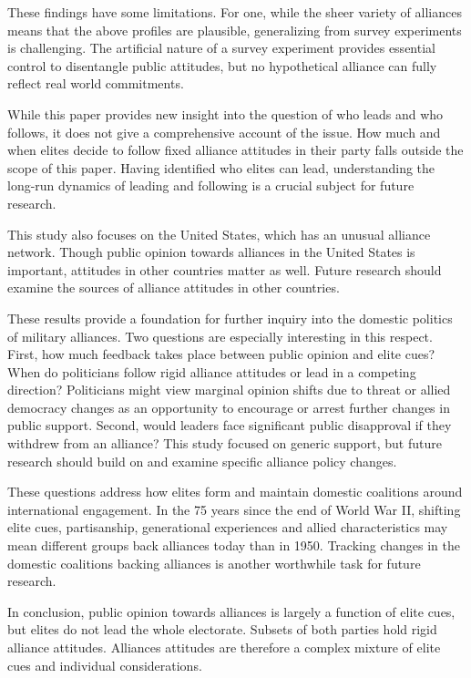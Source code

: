 \documentclass[12pt]{article}
\begin{document}
These findings have some limitations. 
For one, while the sheer variety of alliances means that the above profiles are plausible, generalizing from survey experiments is challenging. 
The artificial nature of a survey experiment provides essential control to disentangle public attitudes, but no hypothetical alliance can fully reflect real world commitments.


While this paper provides new insight into the question of who leads and who follows, it does not give a comprehensive account of the issue. 
How much and when elites decide to follow fixed alliance attitudes in their party falls outside the scope of this paper. 
Having identified who elites can lead, understanding the long-run dynamics of leading and following is a crucial subject for future research. 


This study also focuses on the United States, which has an unusual alliance network. 
Though public opinion towards alliances in the United States is important, attitudes in other countries matter as well. 
Future research should examine the sources of alliance attitudes in other countries. 


These results provide a foundation for further inquiry into the domestic politics of military alliances. 
Two questions are especially interesting in this respect.
First, how much feedback takes place between public opinion and elite cues? 
When do politicians follow rigid alliance attitudes or lead in a competing direction? 
Politicians might view marginal opinion shifts due to threat or allied democracy changes as an opportunity to encourage or arrest further changes in public support.
Second, would leaders face significant public disapproval if they withdrew from an alliance? 
This study focused on generic support, but future research should build on \citet{TomzWeeks2021} and examine specific alliance policy changes. 


These questions address how elites form and maintain domestic coalitions around international engagement. 
In the 75 years since the end of World War II, shifting elite cues, partisanship, generational experiences and allied characteristics may mean different groups back alliances today than in 1950. 
Tracking changes in the domestic coalitions backing alliances is another worthwhile task for future research.


In conclusion, public opinion towards alliances is largely a function of elite cues, but elites do not lead the whole electorate.  
Subsets of both parties hold rigid alliance attitudes. 
Alliances attitudes are therefore a complex mixture of elite cues and individual considerations. 



\newpage

 
 
\end{document}
